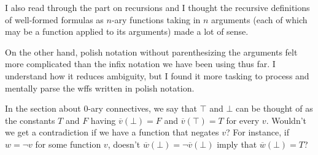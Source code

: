 \documentclass[english, 11pt]{amsart}
\begin{document}
\setlength{\headheight}{13.0pt}
\setlength{\footskip}{15.0pt}




I also  read through the part on recursions and
I thought the recursive definitions of well-formed formulas
as $n$-ary functions taking in $n$
arguments (each of which may be a function applied to its arguments)
made a lot of sense.

On the other hand, polish notation without parenthesizing
the arguments felt more complicated than the infix notation we
have been using thus far. I understand how it reduces ambiguity,
but I found it more tasking to process and mentally parse the wffs written in polish notation.


In the section about $0$-ary connectives,
we say that $\top$ and $\bot$ can be thought of as
the constants $T$ and $F$ having $\overline{v}(\bot) = F$ and $\overline{v}(\top) = T$
for every $v$.
Wouldn't we get a contradiction if we have a function that negates $v$?
For instance, if $w = \lnot v$ for some function $v$,
doesn't $\overline{w}(\bot) = \lnot \overline{v}(\bot)$ imply that
$\overline{w}(\bot) = T$?
\end{document}
